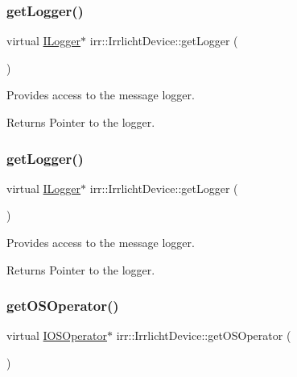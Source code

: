 \subsubsection{\texorpdfstring{get\+Logger()}{getLogger()}\hspace{0.1cm}{\footnotesize\ttfamily [2/3]}}
{\footnotesize\ttfamily virtual \hyperlink{classirr_1_1ILogger}{I\+Logger}$\ast$ irr\+::\+Irrlicht\+Device\+::get\+Logger (\begin{DoxyParamCaption}{ }\end{DoxyParamCaption})\hspace{0.3cm}{\ttfamily [pure virtual]}}



Provides access to the message logger. 

\begin{DoxyReturn}{Returns}
Pointer to the logger. 
\end{DoxyReturn}
\mbox{\label{classirr_1_1IrrlichtDevice_adec0b0b6b71b5066dd2c7039f1f4d85b}} 
\subsubsection{\texorpdfstring{get\+Logger()}{getLogger()}\hspace{0.1cm}{\footnotesize\ttfamily [3/3]}}
{\footnotesize\ttfamily virtual \hyperlink{classirr_1_1ILogger}{I\+Logger}$\ast$ irr\+::\+Irrlicht\+Device\+::get\+Logger (\begin{DoxyParamCaption}{ }\end{DoxyParamCaption})\hspace{0.3cm}{\ttfamily [pure virtual]}}



Provides access to the message logger. 

\begin{DoxyReturn}{Returns}
Pointer to the logger. 
\end{DoxyReturn}
\mbox{\label{classirr_1_1IrrlichtDevice_a3833250e8b0d7a94cd34b1e1809033ac}} 
\subsubsection{\texorpdfstring{get\+O\+S\+Operator()}{getOSOperator()}\hspace{0.1cm}{\footnotesize\ttfamily [1/3]}}
{\footnotesize\ttfamily virtual \hyperlink{classirr_1_1IOSOperator}{I\+O\+S\+Operator}$\ast$ irr\+::\+Irrlicht\+Device\+::get\+O\+S\+Operator (\begin{DoxyParamCaption}{ }\end{DoxyParamCaption})\hspace{0.3cm}{\ttfamily [pure virtual]}}




